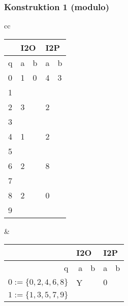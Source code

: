 \begin{frame}
  \frametitle{Konstruktion 1 (modulo)}
  \centering
  \begin{tabular}{cc}
    \begin{tabular}{|l|l|l|l|l|}
      \hline
      & \multicolumn{2}{l|}{I2O} & \multicolumn{2}{l|}{I2P} \\\hline
    q & a           & b          & a           & b          \\\hline\hline
    \cellcolor[HTML]{DAE8FC}0  & 1            &  0          &  4           &  3          \\\hline
    1 &             &            &             &            \\\hline
    \cellcolor[HTML]{DAE8FC}2 &  3           &            & 2            &            \\\hline
    3 &             &            &             &            \\\hline
    \cellcolor[HTML]{DAE8FC}4 &  1           &            & 2            &            \\\hline
    5 &             &            &             &            \\\hline
    \cellcolor[HTML]{DAE8FC}6 &  2           &            & 8            &            \\\hline
    7 &             &            &             &            \\\hline
    \cellcolor[HTML]{DAE8FC}8 &  2           &            & 0            &            \\\hline
    9 &             &            &             &           \\\hline
    \end{tabular}
    &
    \begin{tabular}{|r|r|r|r|r|}
      \hline
      & \multicolumn{2}{l|}{I2O} & \multicolumn{2}{l|}{I2P} \\\hline
    q & a           & b          & a           & b          \\\hline\hline
    \cellcolor[HTML]{DAE8FC}$0:=\{0,2,4,6,8\}$  & Y            &           & $0$            &            \\\hline
    $1:=\{1,3,5,7,9\}$ &             &            &             &            \\\hline
    \end{tabular}
    \end{tabular}
\end{frame}


